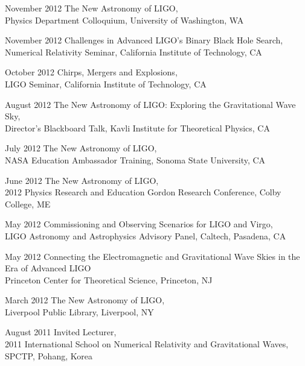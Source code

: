 \documentclass{cv}
\begin{document}
\begin{entry}
\item[November 2012] {The New Astronomy of LIGO},\\
{\small Physics Department Colloquium, University of Washington, WA}

\item[November 2012] {Challenges in Advanced LIGO's Binary Black Hole Search},\\
{\small Numerical Relativity Seminar, California Institute of Technology, CA}

\item[October 2012] {Chirps, Mergers and Explosions},\\
{\small LIGO Seminar, California Institute of Technology, CA}

\item[August 2012] {The New Astronomy of LIGO: Exploring the Gravitational Wave Sky},\\
{\small Director's Blackboard Talk, Kavli Institute for Theoretical Physics,
CA}

\item[July 2012] {The New Astronomy of LIGO},\\
{\small NASA Education Ambassador Training, Sonoma State University, CA}

\item[June 2012] {The New Astronomy of LIGO},\\
{\small 2012 Physics Research and Education Gordon Research Conference, Colby College, ME}

\item[May 2012] {Commissioning and Observing Scenarios for LIGO and Virgo},\\
{\small LIGO Astronomy and Astrophysics Advisory Panel, Caltech, Pasadena, CA}

\item[May 2012] {Connecting the Electromagnetic and Gravitational Wave Skies in the Era of Advanced LIGO}\\
{Princeton Center for Theoretical Science, Princeton, NJ}

\item[March 2012] {The New Astronomy of LIGO},\\
{\small Liverpool Public Library, Liverpool, NY}

\item[August 2011] {Invited Lecturer},\\
{\small 2011 International School on Numerical Relativity and Gravitational
Waves, SPCTP, Pohang, Korea}


\end{entry}
\end{document}
